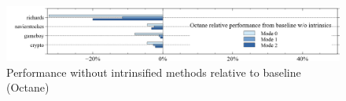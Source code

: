 \begin{figure}[ht]
  \begin{center}
    \centering
    \includegraphics[width=1.0\textwidth]{figures/octane_noi_variation.png}
    \caption{Performance without intrinsified methods relative to baseline (Octane)}
    \label{f:octane_noi_variation}
  \end{center}
\end{figure}
